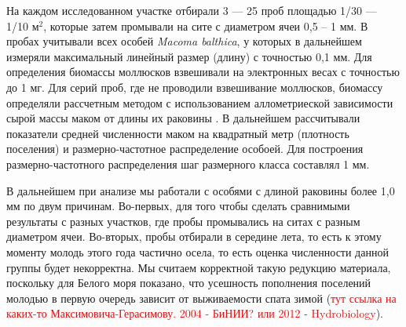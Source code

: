 \documentclass[12pt, a4paper]{article}
\begin{document}
На каждом исследованном участке отбирали 3 --- 25 проб площадью 1/30 --- 1/10 м$^2$, которые затем промывали на сите с диаметром ячеи 0,5 -- 1 мм. 
В пробах учитывали всех особей {\it Macoma balthica}, у которых в дальнейшем измеряли максимальный линейный размер (длину) с точностью 0,1 мм. 
Для определения биомассы моллюсков взвешивали на электронных весах с точностью до 1 мг. Для серий проб, где не проводили взвешивание моллюсков, биомассу определяли рассчетным методом с использованием аллометриеской зависимости сырой массы маком от длины их раковины \citep{Maximovich_et_al_1993}.
В дальнейшем рассчитывали показатели средней численности маком на квадратный метр (плотность поселения) и размерно-частотное распределение особоей.
Для построения размерно-частотного распределения шаг размерного класса составлял 1 мм.


В дальнейшем при анализе мы работали с особями с длиной раковины более 1,0 мм по двум причинам. 
Во-первых, для того чтобы сделать сравнимыми результаты с разных участков, где пробы промывались на ситах с разным диаметром ячеи. 
Во-вторых, пробы отбирали в середине лета, то есть к этому моменту молодь этого года частично осела, то есть оценка численности данной группы будет некорректна.
Мы считаем корректной такую редукцию материала, поскольку для Белого моря показано, что усешность пополнения поселений молодью в первую очередь зависит от выживаемости спата зимой (\textcolor{red}{тут ссылка на каких-то Максимовича-Герасимову. 2004 - БиНИИ? или 2012 - Hydrobiology}).





 
\end{document}
